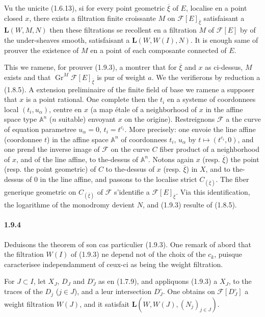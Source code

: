 \documentclass[12pt,a4paper]{article}
\theoremstyle{plain}
\theoremstyle{definition}
\theoremstyle{remark}
\DeclareMathOperator{\Gr}{Gr}
\renewcommand{\AA}{\ensuremath{\mathbb{A}}}
\begin{document}
Vu the unicite (1.6.13), si for every point geometric $\overline{\xi}$ of $E$, localise en a point closed $x$, there exists a filtration finite croissante $M$ on $\mathscr{F}[E]_{\overline{\xi}}$ satisfaisant a $\mathbf{L}(W, M, N)$ then these filtrations se recollent en a filtration $M$ of $\mathscr{F}[E]$ by of the under-sheaves smooth, satisfaisant a $\mathbf{L}(W, W(I), N)$. It is enough same of prouver the existence of $M$ en a point of each composante connected of $E$.

This we ramene, for prouver (1.9.3), a montrer that for $\overline{\xi}$ and $x$ as ci-dessus, $M$ exists and that $\Gr^M \mathscr{F}[E]_{\overline{\xi}}$ is pur of weight $a$. We the verifierons by reduction a (1.8.5). A extension preliminaire of the finite field of base we ramene a supposer that $x$ is a point rational. One complete then the $t_i$ en a systeme of coordonnees local $(t_i, u_\alpha)$, centre en $x$ (a map étale of a neighborhood of $x$ in the affine space type $\AA^n$ ($n$ suitable) envoyant $x$ on the origine). Restreignons $\mathscr{F}$ a the curve of equation parametree $u_\alpha = 0$, $t_i = t^{c_i}$. More precisely: one envoie the line affine (coordonnee $t$) in the affine space $\AA^n$ of coordonnees $t_i$, $u_\alpha$ by $t \mapsto (t^{c_i}, 0)$, and one prend the inverse image of $\mathscr{F}$ on the curve $C$ fiber product of a neighborhood of $x$, and of the line affine, to the-dessus of $\AA^n$. Notons again $x$ (resp. $\overline{\xi}$) the point (resp. the point geometric) of $C$ to the-dessus of $x$ (resp. $\overline{\xi}$) in $X$, and to the-dessus of $0$ in the line affine, and passons to the localise strict $C_{(\overline{\xi})}$. The fiber generique geometric on $C_{(\overline{\xi})}$ of $\mathscr{F}$ s'identifie a $\mathscr{F}[E]_{\overline{\xi}}$. Via this identification, the logarithme of the monodromy devient $N$, and (1.9.3) resulte of (1.8.5).

\paragraph{1.9.4}
Deduisons the theorem of son cas particulier (1.9.3). One remark of abord that the filtration $W(I)$ of (1.9.3) ne depend not of the choix of the $c_k$, puisque caracterisee independamment of ceux-ci as being the weight filtration.

For $J \subset I$, let $X_J$, $D_J$ and $D_J^\circ$ as en (1.7.9), and appliquons (1.9.3) a $X_J$, to the traces of the $D_j$ ($j \in J$), and a leur intersection $D_J^\circ$. One obtains on $\mathscr{F}[D_J^\circ]$ a weight filtration $W(J)$, and it satisfait $\mathbf{L}(W, W(J), (N_j)_{j \in J})$.
\end{document}
